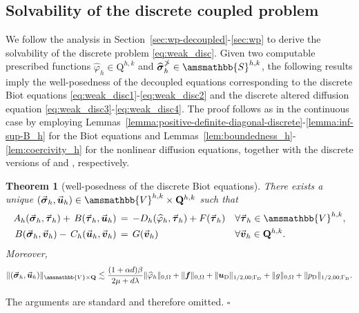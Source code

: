 \documentclass[fleqn,a4paper]{cas-sc}
\newcommand{\bbS}{\amsmathbb{S}}
\newcommand{\bu}{\boldsymbol{u}}
\newcommand{\bv}{\boldsymbol{v}}
\newcommand{\ff}{\boldsymbol{f}}
\newcommand{\0}{\boldsymbol{0}}
\newcommand\bQ{\mathbf{Q}}
\newcommand\rQ{\mathrm{Q}}
\newcommand\bbV{\amsmathbb{V}}
\newcommand\bbPi{\mathbb{\Pi}}
\newcommand\bsigma{\boldsymbol{\sigma}}
\newcommand\btau{\boldsymbol{\tau}}
\numberwithin{equation}{section}
\numberwithin{figure}{section}
\newtheorem{theorem}{Theorem}[section]
\newenvironment{proof}{\noindent{\it Proof.}}{\hfill$\square$}
\begin{document}
\subsection{Solvability of the discrete coupled problem}
We follow the analysis in Section~\ref{sec:wp-decoupled}-\ref{sec:wp} to derive the solvability of the discrete problem \eqref{eq:weak_disc}. Given two computable prescribed functions $\widehat{\varphi}_h \in \rQ^{h,k}$ and $\widehat{\bsigma}_h^{\bbPi} \in \bbS^{h,k}$, the following results imply the well-posedness of the decoupled equations corresponding to the discrete Biot equations \eqref{eq:weak_disc1}-\eqref{eq:weak_disc2} and the discrete altered diffusion equation \eqref{eq:weak_disc3}-\eqref{eq:weak_disc4}. The proof follows as in the continuous case by employing Lemmas~\ref{lemma:positive-definite-diagonal-discrete}-\ref{lemma:inf-sup-B_h} for the Biot equations and Lemmas~\ref{lem:boundedness_h}-\ref{lem:coercivity_h} for the nonlinear diffusion equations, together with the discrete versions of \cite[Theorem 4.3.1]{boffi13} and \cite[Corollary 2.2]{showalter1997}, respectively.
\begin{theorem}[well-posedness of the discrete Biot equations]\label{th:well-posed-Biot-disc}
 There exists a unique  $( \vec{\bsigma}_h, \vec{\bu}_h) \in \bbV^{h,k}\times \bQ^{h,k}$ such that 
 \begin{subequations}\label{eq:well-posed-Biot-disc}
     \begin{align}
        A_h(\vec{\bsigma}_h, \vec{\btau}_h)+\,B(\vec{\btau}_h, \vec{\bu}_h) &   \, =\, -D_h(\widehat{\varphi}_h,\vec{\btau}_h) + F(\vec{\btau}_h)  &&\forall \vec{\btau}_h \in \bbV^{h,k},\\ 
        B(\vec{\bsigma}_h,  \vec{\bv}_h) -\,C_h(\vec{\bu}_h, \vec{\bv}_h) &  \,=\, G(\vec{\bv}_h)&&\forall \vec{\bv}_h \in \bQ^{h,k}.  
     \end{align}
 \end{subequations}
 Moreover, 
 \[ \| ( \vec{\bsigma}_h, \vec{\bu}_h) \|_{\bbV\times \bQ} \lesssim  \frac{(1+\alpha d)\beta}{2\mu + d\lambda}\|\widehat{\varphi}_h\|_{0,\Omega} + \|\ff\|_{0,\Omega} + \|\bu_{\mathrm{D}}\|_{1/2,00;\Gamma_{\mathrm{D}}} + \|g\|_{0,\Omega} + \|p_{\mathrm{D}}\|_{1/2,00;\Gamma_{\mathrm{D}}}. \]
\end{theorem}
\begin{proof}
    The arguments are standard and therefore omitted.
\end{proof}
\end{document}
